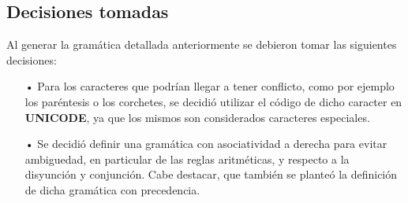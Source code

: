 \subsection{Decisiones tomadas}

Al generar la gram\'atica detallada anteriormente se debieron tomar las siguientes decisiones:

\begin{itemize}

\item[•] Para los caracteres que podr\'ian llegar a tener conflicto, como por ejemplo los par\'entesis o los corchetes, se decidi\'o utilizar el c\'odigo de dicho caracter en \textbf{UNICODE}, ya que los mismos son considerados caracteres especiales.

\item[•]Se decidi\'o definir una gram\'atica con asociatividad a derecha para evitar ambiguedad, en particular de las reglas aritm\'eticas, y respecto a la disyunci\'on y conjunci\'on. Cabe destacar, que tambi\'en se plante\'o la definici\'on de dicha gram\'atica con precedencia.


\end{itemize}

